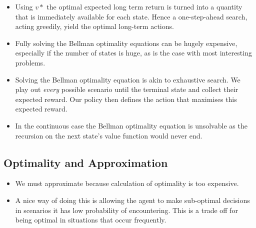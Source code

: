 \begin{itemize}
\item Using \(v*\) the optimal expected long term return is turned into a quantity that is immediately available for each state. Hence a one-step-ahead search, acting greedily, yield the optimal long-term actions.
\item Fully solving the Bellman optimality equations can be hugely expensive, especially if the number of states is huge, as is the case with most interesting problems.
\item Solving the Bellman optimality equation is akin to exhaustive search. We play out \textit{every} possible scenario until the terminal state and collect their expected reward. Our policy then defines the action that maximises this expected reward. 
\item In the continuous case the Bellman optimality equation is unsolvable as the recursion on the next state's value function would never end.
\end{itemize}

\subsection{Optimality and Approximation}
\begin{itemize}
	\item We must approximate because calculation of optimality is too expensive.
	\item A nice way of doing this is allowing the agent to make sub-optimal decisions in scenarios it has low probability of encountering. This is a trade off for being optimal in situations that occur frequently.
\end{itemize}

